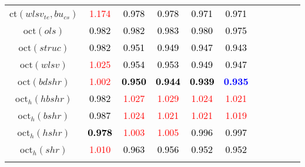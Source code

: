 \begin{tabular}[t]{c|>{}cccc>{}c|ccccc}
ct$(wlsv_{te}, bu_{cs})$ & \textcolor{red}{1.174} & \textcolor{black}{0.978} & \textcolor{black}{0.978} & \textcolor{black}{0.971} & \textcolor{black}{0.971} &  &  &  &  & \\
oct$(ols)$ & \textcolor{black}{0.982} & \textcolor{black}{0.982} & \textcolor{black}{0.983} & \textcolor{black}{0.980} & \textcolor{black}{0.975} &  &  &  &  & \\
oct$(struc)$ & \textcolor{black}{0.982} & \textcolor{black}{0.951} & \textcolor{black}{0.949} & \textcolor{black}{0.947} & \textcolor{black}{0.943} &  &  &  &  & \\
oct$(wlsv)$ & \textcolor{red}{1.025} & \textcolor{black}{0.954} & \textcolor{black}{0.953} & \textcolor{black}{0.949} & \textcolor{black}{0.947} &  &  &  &  & \\
oct$(bdshr)$ & \textcolor{red}{1.002} & \textcolor{black}{\textbf{0.950}} & \textcolor{black}{\textbf{0.944}} & \textcolor{black}{\textbf{0.939}} & \textcolor{blue}{\textbf{0.935}} &  &  &  &  & \\
oct$_h(hbshr)$ & \textcolor{black}{0.982} & \textcolor{red}{1.027} & \textcolor{red}{1.029} & \textcolor{red}{1.024} & \textcolor{red}{1.021} &  &  &  &  & \\
oct$_h(bshr)$ & \textcolor{black}{0.987} & \textcolor{red}{1.024} & \textcolor{red}{1.021} & \textcolor{red}{1.021} & \textcolor{red}{1.019} &  &  &  &  & \\
oct$_h(hshr)$ & \textcolor{black}{\textbf{0.978}} & \textcolor{red}{1.003} & \textcolor{red}{1.005} & \textcolor{black}{0.996} & \textcolor{black}{0.997} &  &  &  &  & \\
oct$_h(shr)$ & \textcolor{red}{1.010} & \textcolor{black}{0.963} & \textcolor{black}{0.956} & \textcolor{black}{0.952} & \textcolor{black}{0.952} &  &  &  &  & \\
\bottomrule
{}\\
\end{tabular}
